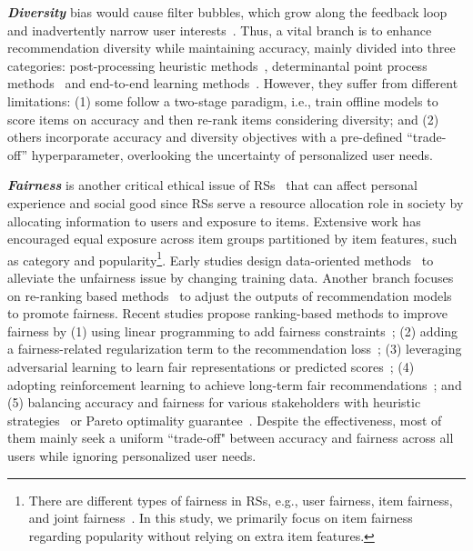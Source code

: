 \smallskip\noindent\textit{\textbf{Diversity}} bias would cause filter bubbles, which grow along the feedback loop and inadvertently narrow user interests~\cite{khenissi2020theoretical}. Thus, a vital branch is to enhance recommendation diversity while maintaining accuracy, mainly divided into three categories: post-processing heuristic methods~\cite{steck2018calibrated,lin2022feature,sha2016framework}, determinantal point process methods~\cite{chen2018fast,wu2019pd,gan2020enhancing,liu2022determinantal,warlop2019tensorized} and end-to-end learning methods~\cite{zheng2021dgcn,liang2021enhancing,chen2020improving,chen2021multi,shi2024diversifying,yang2023dgrec,wang2019modeling,cen2020controllable,lu2021future,wang2024sparks,stamenkovic2022choosing,liu2023generative}. However, they suffer from different limitations: (1) some follow a two-stage paradigm, i.e., train offline models to score items on accuracy and then re-rank items considering diversity; and (2) others incorporate accuracy and diversity objectives with a pre-defined ``trade-off'' hyperparameter, overlooking the uncertainty of personalized user needs. 

\smallskip\noindent\textit{\textbf{Fairness}} is another critical ethical issue of RSs~\cite{wang2023survey,li2023fairness,deldjoo2024fairness} that can affect personal experience and social good since RSs serve a resource allocation role in society by allocating information to users and exposure to items.
Extensive work has encouraged equal exposure across item groups partitioned by item features, such as category and popularity\footnote{
There are different types of fairness in RSs, e.g., user fairness, item fairness, and joint fairness~\cite{wang2023survey}. In this study, we primarily focus on item fairness regarding popularity without relying on extra item features.}. 
Early studies design {data-oriented methods}~\cite{ekstrand2018all} to alleviate the unfairness issue by changing training data. 
Another branch focuses on {re-ranking based methods}~\cite{liu2019personalized,steck2018calibrated} to adjust the outputs of recommendation models to promote fairness. 
Recent studies propose {ranking-based methods} to improve fairness by (1) using linear programming to add fairness constraints~\cite{singh2018fairness}; (2) adding a fairness-related regularization term to the recommendation loss~\cite{beutel2019fairness,zhu2018fairness}; 
(3) leveraging adversarial learning to learn fair representations or predicted scores~\cite{bose2019compositional,wu2021learning,zhu2020measuring}; (4) adopting reinforcement learning to achieve long-term fair recommendations~\cite{ge2021towards}; and 
(5) balancing accuracy and fairness for various stakeholders with heuristic strategies~\cite{wu2021tfrom,patro2020fairrec} or Pareto optimality guarantee~\cite{wu2022multi,ge2022toward}. 
Despite the effectiveness, most of them mainly seek a uniform ``trade-off" between accuracy and fairness across all users while ignoring personalized user needs.  

